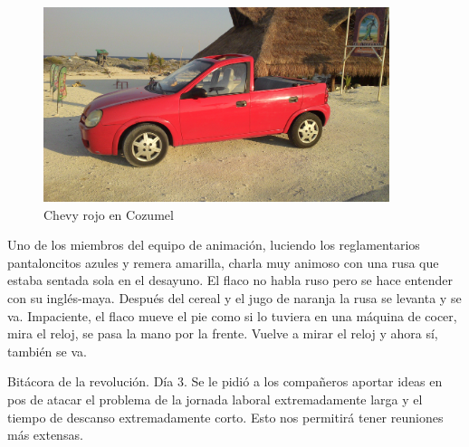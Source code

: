 \documentclass[12pt,twoside,openright,a5paper]{book}
\begin{document}
\begin{figure}[H]
  \centering
    \includegraphics[width=0.9\textwidth]{fotos/2013/auto}
  \caption{Chevy rojo en Cozumel}
  \label{Chevy rojo en Cozumel}
\end{figure}


\vspace{0.5cm}
\hrulefill\hspace{0.2cm} \decofourleft\decofourright \hspace{0.2cm} \hrulefill
\vspace{0.5cm}

Uno de los miembros del equipo de animación, luciendo los reglamentarios
pantaloncitos azules y remera amarilla, charla muy animoso con una rusa que
estaba sentada sola en el desayuno. El flaco no habla ruso pero se hace
entender con su inglés-maya. Después del cereal y el jugo de naranja
la rusa se levanta y se va. Impaciente, el flaco mueve el pie como si lo
tuviera en una máquina de cocer, mira el reloj, se pasa la mano por la
frente. Vuelve a mirar el reloj y ahora sí, también se va.


\vspace{0.5cm}
\hrulefill\hspace{0.2cm} \decofourleft\decofourright \hspace{0.2cm} \hrulefill
\vspace{0.5cm}

Bitácora de la revolución. Día 3. Se le pidió a los compañeros aportar
ideas en pos de atacar el problema de la jornada laboral extremadamente
larga y el tiempo de descanso extremadamente corto. Esto nos permitirá
tener reuniones más extensas.



\vspace{0.5cm}
\hrulefill\hspace{0.2cm} \decofourleft\decofourright \hspace{0.2cm} \hrulefill
\vspace{0.5cm}
\end{document}
